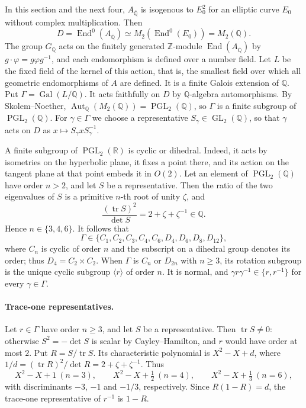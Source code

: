\documentclass[11pt]{article}
\newcommand{\Q}{\mathbb Q}
\newcommand{\Z}{\mathbb Z}
\DeclareMathOperator{\End}{End}
\DeclareMathOperator{\Gal}{Gal}
\DeclareMathOperator{\GL}{GL}
\DeclareMathOperator{\PGL}{PGL}
\DeclareMathOperator{\Aut}{Aut}
\DeclareMathOperator{\tr}{tr}
\begin{document}
In this section and the next four, \(A_{\overline{\Q}}\) is isogenous
to \(E_0^2\) for an elliptic curve \(E_0\) without complex
multiplication. Then
\[
 D=\End^0(A_{\overline{\Q}})\simeq M_2(\End^0(E_0))=M_2(\Q).
\]
The group \(G_{\Q}\) acts on the finitely generated \(\Z\)-module
\(\End(A_{\overline{\Q}})\) by \(g\cdot\varphi=g\varphi g^{-1}\), and
each endomorphism is defined over a number field. Let \(L\) be the
fixed field of the kernel of this action, that is, the smallest field
over which all geometric endomorphisms of \(A\) are defined. It is a
finite Galois extension of \(\Q\). Put \(\Gamma=\Gal(L/\Q)\). It acts
faithfully on \(D\) by \(\Q\)-algebra automorphisms. By
Skolem--Noether, \(\Aut_{\Q}(M_2(\Q))=\PGL_2(\Q)\), so \(\Gamma\) is a
finite subgroup of \(\PGL_2(\Q)\). For \(\gamma\in\Gamma\) we choose a
representative \(S_\gamma\in\GL_2(\Q)\), so that \(\gamma\) acts on
\(D\) as \(x\mapsto S_\gamma xS_\gamma^{-1}\).

A finite subgroup of \(\PGL_2(\mathbb R)\) is cyclic or dihedral.
Indeed, it acts by isometries on the hyperbolic plane, it fixes a point
there, and its action on the tangent plane at that point embeds it in
\(O(2)\). Let an element of \(\PGL_2(\Q)\) have order \(n>2\), and let
\(S\) be a representative. Then the ratio of the two eigenvalues of
\(S\) is a primitive \(n\)-th root of unity \(\zeta\), and
\[
 \frac{(\tr S)^2}{\det S}=2+\zeta+\zeta^{-1}\in\Q .
\]
Hence \(n\in\{3,4,6\}\). It follows that
\[
 \Gamma\in\{C_1,C_2,C_3,C_4,C_6,D_4,D_6,D_8,D_{12}\},
\]
where \(C_n\) is cyclic of order \(n\) and the subscript on a dihedral
group denotes its order; thus \(D_4=C_2\times C_2\). When \(\Gamma\)
is \(C_n\) or \(D_{2n}\) with \(n\ge3\), its rotation subgroup is the
unique cyclic subgroup \(\langle r\rangle\) of order \(n\). It is
normal, and \(\gamma r\gamma^{-1}\in\{r,r^{-1}\}\) for every
\(\gamma\in\Gamma\).

\paragraph{Trace-one representatives.} Let \(r\in\Gamma\) have order
\(n\ge3\), and let \(S\) be a representative. Then \(\tr S\neq0\):
otherwise \(S^2=-\det S\) is scalar by Cayley--Hamilton, and \(r\) would
have order at most \(2\). Put \(R=S/\tr S\). Its characteristic
polynomial is \(X^2-X+d\), where
\(1/d=(\tr R)^2/\det R=2+\zeta+\zeta^{-1}\). Thus
\[
 X^2-X+1\ (n=3),\qquad X^2-X+\tfrac12\ (n=4),\qquad
 X^2-X+\tfrac13\ (n=6),
\]
with discriminants \(-3\), \(-1\) and \(-1/3\), respectively. Since
\(R(1-R)=d\), the trace-one representative of \(r^{-1}\) is \(1-R\).
\end{document}
